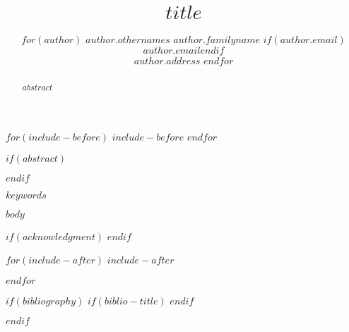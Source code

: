 \documentclass[$for(classoption)$$classoption$$sep$,$endfor$]{article}
\begin{document}
\def\proof{\par\noindent{\bf Proof\ }}
\def\endproof{\hfill\BlackBox\\[2mm]}

\title{$title$}

\author{$for(author)$%
\name $author.othernames$ $author.familyname$ $if(author.email)$\email $author.email$$endif$ \\\addr $author.address$ \AND
$endfor$}


\maketitle

$for(include-before)$
$include-before$
$endfor$


$if(abstract)$
\begin{abstract}
$abstract$
\end{abstract}
$endif$

\begin{keywords}
$keywords$
\end{keywords}


$body$


$if(acknowledgment)$
$endif$

$for(include-after)$
$include-after$

$endfor$

$if(bibliography)$
$if(biblio-title)$
\renewcommand\refname{$biblio-title$}
$endif$
\vskip 0.2in

$endif$
\end{document}

